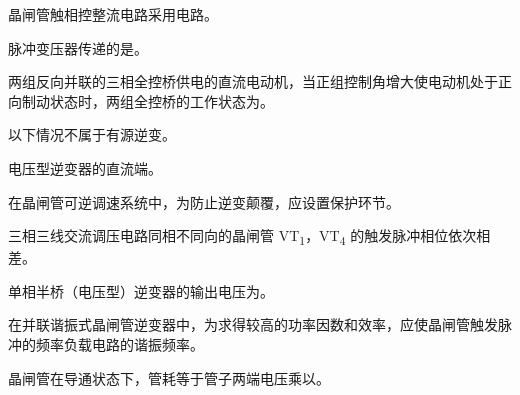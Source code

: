 \documentclass[电力电子]{subfiles}
\begin{document}
\begin{ti}
	晶闸管触相控整流电路采用电路。
\end{ti}

\begin{ti}
	脉冲变压器传递的是。
\end{ti}

\begin{ti}
	两组反向并联的三相全控桥供电的直流电动机，当正组控制角增大使电动机处于正向制动状态时，两组全控桥的工作状态为。
\end{ti}

\begin{ti}
	以下情况不属于有源逆变。
\end{ti}

\begin{ti}
	电压型逆变器的直流端。
\end{ti}

\begin{ti}
	在晶闸管可逆调速系统中，为防止逆变颠覆，应设置保护环节。
\end{ti}

\begin{ti}
	三相三线交流调压电路同相不同向的晶闸管 VT\textsubscript{1}，VT\textsubscript{4} 的触发脉冲相位依次相差。
\end{ti}

\begin{ti}
	单相半桥（电压型）逆变器的输出电压为。
\end{ti}

\begin{ti}
	在并联谐振式晶闸管逆变器中，为求得较高的功率因数和效率，应使晶闸管触发脉冲的频率负载电路的谐振频率。
\end{ti}

\begin{ti}
	晶闸管在导通状态下，管耗等于管子两端电压乘以。
\end{ti}
\end{document}
